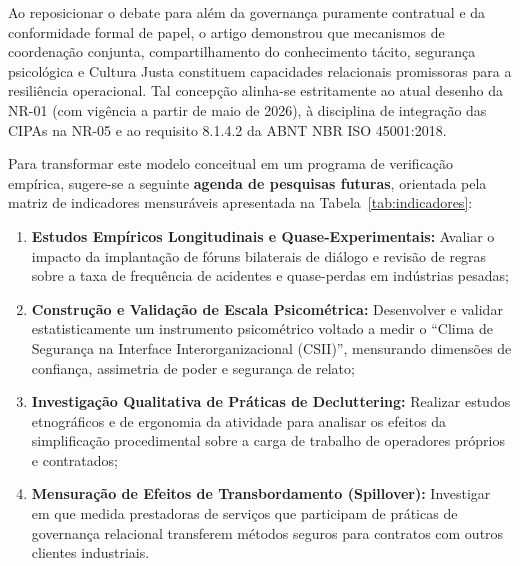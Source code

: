 \documentclass[12pt,a4paper]{article}
\begin{document}
Ao reposicionar o debate para além da governança puramente contratual e da conformidade formal de papel, o artigo demonstrou que mecanismos de coordenação conjunta, compartilhamento do conhecimento tácito, segurança psicológica e Cultura Justa constituem capacidades relacionais promissoras para a resiliência operacional. Tal concepção alinha-se estritamente ao atual desenho da NR-01 (com vigência a partir de maio de 2026), à disciplina de integração das CIPAs na NR-05 e ao requisito 8.1.4.2 da ABNT NBR ISO 45001:2018.

Para transformar este modelo conceitual em um programa de verificação empírica, sugere-se a seguinte \textbf{agenda de pesquisas futuras}, orientada pela matriz de indicadores mensuráveis apresentada na Tabela~\ref{tab:indicadores}:
\begin{enumerate}[label=\arabic*)]
  \item \textbf{Estudos Empíricos Longitudinais e Quase-Experimentais:} Avaliar o impacto da implantação de fóruns bilaterais de diálogo e revisão de regras sobre a taxa de frequência de acidentes e quase-perdas em indústrias pesadas;
  \item \textbf{Construção e Validação de Escala Psicométrica:} Desenvolver e validar estatisticamente um instrumento psicométrico voltado a medir o ``Clima de Segurança na Interface Interorganizacional (CSII)'', mensurando dimensões de confiança, assimetria de poder e segurança de relato;
  \item \textbf{Investigação Qualitativa de Práticas de Decluttering:} Realizar estudos etnográficos e de ergonomia da atividade para analisar os efeitos da simplificação procedimental sobre a carga de trabalho de operadores próprios e contratados;
  \item \textbf{Mensuração de Efeitos de Transbordamento (Spillover):} Investigar em que medida prestadoras de serviços que participam de práticas de governança relacional transferem métodos seguros para contratos com outros clientes industriais.
\end{enumerate}
\end{document}

